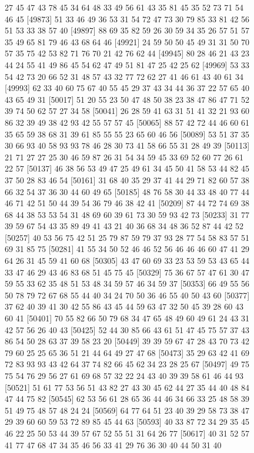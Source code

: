 \documentclass{article}
\begin{document}
\begin{figure}[H]
\begin{Schunk}
\begin{Soutput}
[49849] 27 45 47 43 78 45 34 64 48 33 49 56 61 43 35 81 45 35 52 73 71 54 46 45
[49873] 51 33 46 49 36 53 31 54 72 47 73 30 79 85 33 81 42 56 51 53 33 38 57 40
[49897] 88 69 35 82 59 26 30 59 34 35 26 57 51 57 35 49 65 81 79 46 43 68 64 46
[49921] 24 59 50 50 45 49 31 31 50 70 57 35 75 42 53 82 71 76 70 21 42 76 62 44
[49945] 80 28 46 21 43 23 44 24 55 41 49 86 45 54 62 47 49 51 81 47 25 42 25 62
[49969] 53 33 54 42 73 20 66 52 31 48 57 43 32 77 72 62 27 41 46 61 43 40 61 34
[49993] 62 33 40 60 75 67 40 55 45 29 37 43 34 44 36 37 22 57 65 40 43 65 49 31
[50017] 51 20 55 23 50 47 48 50 38 23 38 47 86 47 71 52 39 74 50 62 57 27 34 58
[50041] 26 28 59 41 63 31 51 41 32 21 93 60 86 32 39 49 38 42 93 42 55 57 57 45
[50065] 88 57 42 72 44 46 60 61 35 65 59 38 68 31 39 61 85 55 55 23 65 60 46 56
[50089] 53 51 37 35 30 66 93 40 58 93 93 78 46 28 30 73 41 58 66 55 31 28 49 39
[50113] 21 71 27 27 25 30 46 59 87 26 31 54 34 59 45 33 69 52 60 77 26 61 22 57
[50137] 46 38 56 53 49 47 25 49 61 34 45 50 41 58 53 44 82 45 37 50 28 83 46 54
[50161] 31 68 40 35 29 37 41 44 29 71 82 60 57 38 66 32 54 37 36 30 44 60 49 65
[50185] 48 76 58 30 44 33 48 40 77 44 46 71 42 51 50 44 39 54 36 79 46 38 42 41
[50209] 87 44 72 74 69 38 68 44 38 53 53 54 31 48 69 60 39 61 73 30 59 93 42 73
[50233] 31 77 39 59 67 54 43 35 89 49 41 43 21 40 36 68 34 48 36 52 87 44 42 52
[50257] 40 53 56 75 42 51 25 79 87 59 79 37 93 28 77 54 58 83 57 51 69 31 85 75
[50281] 41 55 34 50 52 46 46 52 56 46 46 46 60 47 41 29 64 26 31 45 59 41 60 68
[50305] 43 47 60 69 33 23 53 59 53 43 65 44 33 47 46 29 43 46 83 68 51 45 75 45
[50329] 75 36 67 57 47 61 30 47 59 55 33 62 35 48 51 53 48 34 59 57 46 34 59 37
[50353] 66 49 55 56 50 78 79 72 67 68 55 44 40 34 24 70 50 36 46 55 40 50 43 60
[50377] 37 62 40 39 41 30 42 55 86 43 45 44 59 63 47 32 50 45 39 28 60 43 60 41
[50401] 70 55 82 66 50 79 68 34 47 65 48 49 60 49 61 24 43 31 42 57 56 26 40 43
[50425] 52 44 30 85 66 43 61 51 47 45 75 57 37 43 86 54 50 28 63 37 39 58 23 20
[50449] 39 39 59 67 47 28 43 70 73 42 79 60 25 25 65 36 51 21 44 64 49 27 47 68
[50473] 35 29 63 42 41 69 72 83 93 93 43 42 64 37 74 82 66 45 62 34 23 28 25 67
[50497] 49 75 75 54 76 29 56 27 61 69 68 57 32 22 24 43 40 39 39 58 61 46 44 93
[50521] 51 61 77 53 56 51 43 82 27 43 30 45 62 44 27 35 44 40 48 84 47 44 75 82
[50545] 62 53 56 61 28 65 36 44 46 34 66 33 25 48 58 39 51 49 75 48 57 48 24 24
[50569] 64 77 64 51 23 40 39 29 58 73 38 47 29 39 60 60 59 53 72 89 85 45 44 63
[50593] 40 33 87 72 34 29 35 45 46 22 25 50 53 44 39 57 67 52 55 51 31 64 26 77
[50617] 40 31 52 57 41 77 47 68 47 34 35 46 56 33 41 29 76 36 30 40 44 50 31 40

\end{Soutput}
\end{Schunk}
\end{figure}
\end{document}

